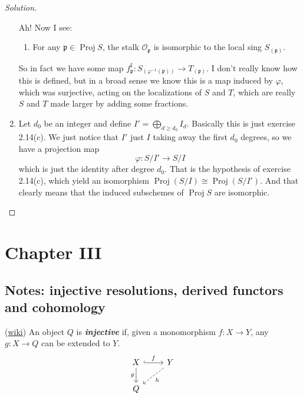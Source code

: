 \begin{proof}[Solution]
\begin{enumerate}[label=\alph*.]
	Ah! Now I see:
	\begin{prop}[2.5]\leavevmode 
	\begin{enumerate}[label=\alph*.]
		\item For any $\mathfrak{p}\in\operatorname{Proj}S$, the stalk $\mathcal{O}_\mathfrak{p}$ is isomorphic to the local sing $S_{(\mathfrak{p})}$.
	\end{enumerate}
\end{prop}
So in fact we have some map $f^\sharp_\mathfrak{p}:S_{(\varphi^{-1}(\mathfrak{p}))}\longrightarrow T_{(\mathfrak{p})}$. I don't really know how this is defined, but in a broad sense we know this is a map induced by $\varphi$, which was surjective, acting on the localizations of $S$ and $T$, which are really $S$ and $T$ made larger by adding some fractions.

\item Let $d_0$ be an integer and define $I'=\bigoplus_{d\geq d_0}I_d$. Basically this is just exercise 2.14(c). We just notice that $I'$ just  $I$ taking away the first $d_0$ degrees, so we have a projection map
	\[\varphi:S/I'\to S/I\]
	which is just the identity after degree $d_0$. That is the hypothesis of exercise 2.14(c), which yield an isomorphism $\operatorname{Proj}(S/I)\cong \operatorname{Proj}(S/I')$. And that clearly means that the induced subschemes of $\operatorname{Proj}S$ are isomorphic.
	
	\end{enumerate}
\end{proof}


\section{Chapter III}

\subsection{Notes: injective resolutions, derived functors and cohomology}
\begin{defn}
	(\href{https://en.wikipedia.org/wiki/Injective_object#:~:text=9%20References-,Definition,can%20be%20extended%20to%20Y%20.}{wiki}) An object $Q$ is \textit{\textbf{injective}} if, given a monomorphism $f:X\to Y$, any $g:X\to Q$ can be extended to $Y$.
\[\begin{tikzcd}
X\arrow[r,"f",hook]\arrow[d,"g",swap]&Y\arrow[dl,"h",dashed]\\
Q
\end{tikzcd}\]
\end{defn}

